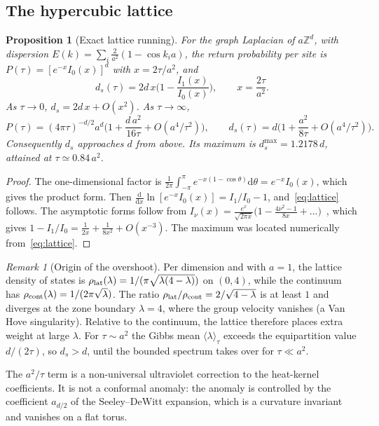 \documentclass[11pt]{article}
\newtheorem{proposition}{Proposition}[section]
\theoremstyle{remark}\newtheorem*{remark}{Remark}
\newcommand{\dd}{\mathrm{d}}
\newcommand{\ZZ}{\mathbb{Z}}
\begin{document}
\subsection{The hypercubic lattice}
\begin{proposition}[Exact lattice running]
\label{prop:lattice}
For the graph Laplacian of $a\ZZ^d$, with dispersion $E(k)=\sum_i\frac{2}{a^2}(1-\cos k_ia)$, the return probability
per site is $P(\tau)=[e^{-x}I_0(x)]^d$ with $x=2\tau/a^2$, and
\begin{equation}
d_s(\tau)=2d\,x\Big(1-\frac{I_1(x)}{I_0(x)}\Big),\qquad x=\frac{2\tau}{a^2}.
\label{eq:lattice}
\end{equation}
As $\tau\to0$, $d_s=2d\,x+O(x^2)$. As $\tau\to\infty$,
\begin{equation}
P(\tau)=(4\pi\tau)^{-d/2}a^d\Big(1+\frac{d\,a^2}{16\tau}+O(a^4/\tau^2)\Big),\qquad d_s(\tau)=d\Big(1+\frac{a^2}{8\tau}+O(a^4/\tau^2)\Big).
\end{equation}
Consequently $d_s$ approaches $d$ \emph{from above}. Its maximum is $d_s^{\max}=1.2178\,d$, attained at
$\tau\simeq0.84\,a^2$.
\end{proposition}
\begin{proof}
The one-dimensional factor is $\frac{1}{2\pi}\int_{-\pi}^{\pi}e^{-x(1-\cos\theta)}\dd\theta=e^{-x}I_0(x)$, which gives
the product form. Then $\frac{\dd}{\dd x}\ln[e^{-x}I_0(x)]=I_1/I_0-1$, and~\eqref{eq:lattice} follows. The asymptotic
forms follow from $I_\nu(x)=\frac{e^x}{\sqrt{2\pi x}}\big(1-\frac{4\nu^2-1}{8x}+\dots\big)$~\cite{DLMF}, which gives
$1-I_1/I_0=\frac{1}{2x}+\frac{1}{8x^2}+O(x^{-3})$. The maximum was located numerically from~\eqref{eq:lattice}.
\end{proof}
\begin{remark}[Origin of the overshoot]
Per dimension and with $a=1$, the lattice density of states is $\rho_{\rm lat}(\lambda)=1/(\pi\sqrt{\lambda(4-\lambda)})$ on
$(0,4)$, while the continuum has $\rho_{\rm cont}(\lambda)=1/(2\pi\sqrt\lambda)$. The ratio
$\rho_{\rm lat}/\rho_{\rm cont}=2/\sqrt{4-\lambda}$ is at least $1$ and diverges at the zone boundary $\lambda=4$, where the group
velocity vanishes (a Van Hove singularity). Relative to the continuum, the lattice therefore places extra weight
at large $\lambda$. For $\tau\sim a^2$ the Gibbs mean $\langle\lambda\rangle_\tau$ exceeds the equipartition value $d/(2\tau)$, so $d_s>d$,
until the bounded spectrum takes over for $\tau\ll a^2$.
\end{remark}
The $a^2/\tau$ term is a non-universal ultraviolet correction to the heat-kernel coefficients. It is not a
conformal anomaly: the anomaly is controlled by the coefficient $a_{d/2}$ of the Seeley--DeWitt expansion,
which is a curvature invariant and vanishes on a flat torus.
\end{document}
